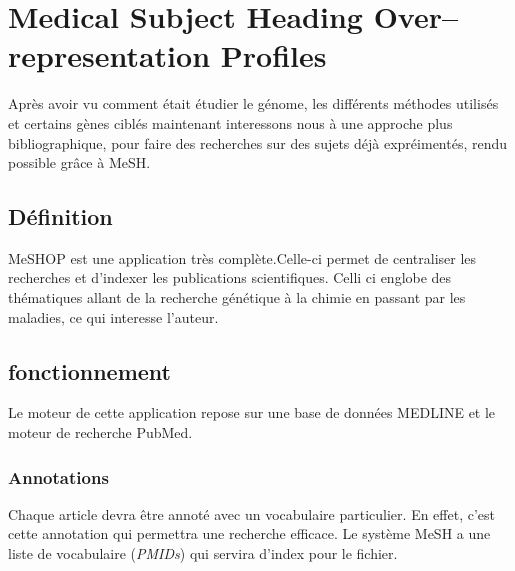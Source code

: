 \section{Medical Subject Heading Over–representation Profiles}

Après avoir vu comment était étudier le génome, les différents méthodes utilisés et certains gènes ciblés maintenant interessons nous à une approche plus bibliographique, pour faire des recherches sur des sujets déjà expréimentés, rendu possible grâce à MeSH.
\subsection{Définition}
MeSHOP est une application très complète.Celle-ci permet de centraliser les recherches et d'indexer les publications scientifiques. Celli ci englobe des thématiques allant de la recherche génétique à la chimie en passant par les maladies, ce qui interesse l'auteur.

\subsection{fonctionnement}
Le moteur de cette application repose sur une base de données MEDLINE et le moteur de recherche PubMed.

\subsubsection{Annotations}
Chaque article devra être annoté avec un vocabulaire particulier. En effet, c'est cette annotation qui permettra une recherche efficace. Le système MeSH a une liste de vocabulaire (\textit{PMIDs}) qui servira d'index pour le fichier.

